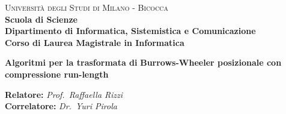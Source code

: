 \documentclass[a4paper,12pt, oneside, draft]{book}
\begin{document}
{} 
\begin{titlepage}
  

  \noindent
  \begin{minipage}[t]{0.19\textwidth}
  \end{minipage}
  \begin{minipage}[t]{0.81\textwidth}
    {
      {\textsc{Università degli Studi di Milano - Bicocca}} \\
      \textbf{Scuola di Scienze} \\
      \textbf{Dipartimento di Informatica, Sistemistica e Comunicazione} \\
      \textbf{Corso di Laurea Magistrale in Informatica} \\
      \par
    }
  \end{minipage}
  
  \vspace{40mm}
  
  \begin{center}
    {\LARGE{
        \textbf{Algoritmi per la trasformata di}}}
    \vspace{1mm}
    {\LARGE{
        \textbf{Burrows-Wheeler posizionale con}}}
    \vspace{1mm}
    {\LARGE{
        \textbf{compressione run-length}}}
    
  \end{center}
  
  \vspace{48mm}

  \noindent
  {\large \textbf{Relatore:} \textit{Prof.~Raffaella Rizzi}} \\

  \noindent
  {\large \textbf{Correlatore:} \textit{Dr.~Yuri Pirola}}
  

\end{titlepage}
\end{document}
